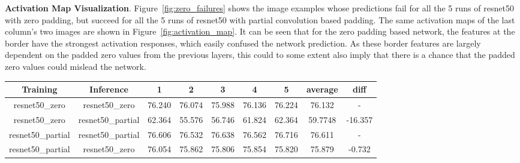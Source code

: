 \documentclass[10pt,twocolumn,letterpaper]{article}
\begin{document}
\begin{figure*}
\label{fig:activation_map}
\end{figure*}\textbf{Activation Map Visualization}. Figure~\ref{fig:zero_failures} shows the image examples whose predictions fail for all the 5 runs of resnet50 with zero padding, but succeed for all the 5 runs of resnet50 with partial convolution based padding. The same activation maps of the last column's two images are shown in Figure~\ref{fig:activation_map}. It can be seen that for the zero padding based network, the features at the border have the strongest activation responses, which easily confused the network prediction. As these border features are largely dependent on the padded zero values from the previous layers, this could to some extent also imply that there is a chance that the padded zero values could mislead the network. 

\begin{table*}[h]
    \centering
    \begin{tabular}{cc|ccccc|cc}
    Training & Inference &1&2&3&4&5&average&diff \\
    \hline
    resnet50\_zero & resnet50\_zero&76.240&76.074&75.988&76.136&76.224&76.132& - \\
    resnet50\_zero & resnet50\_partial& 62.364 & 55.576 & 56.746 & 61.824 & 62.364 & 59.7748 & -16.357\\
    \hline
    resnet50\_partial&resnet50\_partial&76.606&76.532&76.638&76.562&76.716&76.611& - \\
    resnet50\_partial&resnet50\_zero&76.054 & 75.862 & 75.806 & 75.854 & 75.820 & 75.879 & -0.732 \\
    \end{tabular}
    \caption{Cross testing of using one padding scheme for training and the other padding scheme for inference. It can be seen that if the training is with zero padding but inference is with partial convolution based padding, the accuracy drop is much bigger than the opposite direction.}
    \label{tab:cross_testing}

\end{table*}
\end{document}
